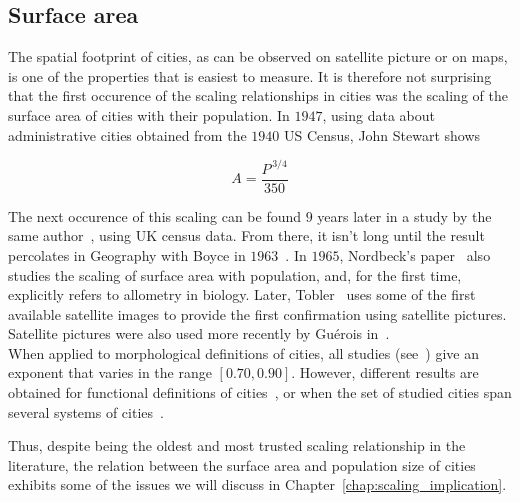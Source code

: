 \subsection{Surface area}
\label{sub:surface_area}

The spatial footprint of cities, as can be observed on satellite picture or on
maps, is one of the properties that is easiest to measure. It is therefore not
surprising that the first occurence of the scaling relationships in cities was
the scaling of the surface area of cities with their population. In $1947$,
using data about administrative cities obtained from the $1940$ US Census, John
Stewart shows

\begin{equation}
    A = \frac{P^{\,3/4}}{350}
\end{equation}

The next occurence of this scaling can be found $9$ years later in a study by
the same author~\cite{Stewart:1958}, using UK census data. From there, it isn't
long until the result percolates in Geography with Boyce in $1963$~\cite{Boyce:1963}.
In $1965$, Nordbeck's paper~\cite{Nordbeck:1965} also studies the scaling of surface area
with population, and, for the first time, explicitly refers to allometry in
biology. Later, Tobler~\cite{Tobler:1969} uses some of the first available
satellite images to provide the first confirmation using satellite pictures.
Satellite pictures were also used more recently by Gu\'erois in~\cite{Guerois:2003}.\\

When applied to morphological definitions of cities, all studies
(see~\cite{Batty:2011}) give an exponent that varies in the range $[0.70,
0.90]$. However, different results are obtained for functional definitions of
cities~\cite{Batty:2011}, or when the set of studied cities span several systems of
cities~\cite{Fuller:2009}.

Thus, despite being the oldest and most trusted scaling relationship in the
literature, the relation between the surface area and population size of cities
exhibits some of the issues we will discuss in
Chapter~\ref{chap:scaling_implication}.


